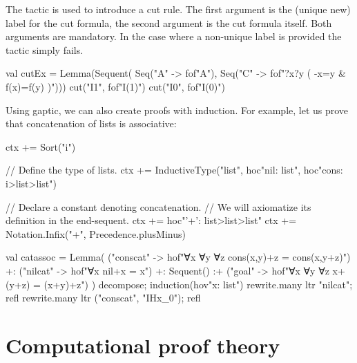 \documentclass[a4paper,11pt]{book}
\newcommand{\cli}[1]{{\ttfamily {#1}}}
\begin{document}
The \cli{cut} tactic is used to introduce a cut rule. The first argument is the
(unique new) label for the cut formula, the second argument is the cut formula
itself. Both arguments are mandatory. In the case where a non-unique label is
provided the tactic simply fails.
\begin{tacticslisting}
val cutEx = Lemma(Sequent(
    Seq("A" -> fof"A"),
    Seq("C" -> fof"?x?y ( -x=y & f(x)=f(y) )"))) {
  cut("I1", fof"I(1)")
  cut("I0", fof"I(0)")
}
\end{tacticslisting}

Using gaptic, we can also create proofs with induction.  For example, let us
prove that concatenation of lists is associative:

\begin{tacticslisting}[nosig]
ctx += Sort("i")

// Define the type of lists.
ctx += InductiveType("list",
  hoc"nil: list",
  hoc"cons: i>list>list")

// Declare a constant denoting concatenation.
// We will axiomatize its definition in the end-sequent.
ctx += hoc"'+': list>list>list"
ctx += Notation.Infix("+", Precedence.plusMinus)

val catassoc =
  Lemma(
      ("conscat" -> hof"∀x ∀y ∀z cons(x,y)+z = cons(x,y+z)") +:
      ("nilcat" -> hof"∀x nil+x = x") +:
      Sequent()
      :+ ("goal" -> hof"∀x ∀y ∀z x+(y+z) = (x+y)+z")
    ) {
  decompose; induction(hov"x: list")
  rewrite.many ltr "nilcat"; refl
  rewrite.many ltr ("conscat", "IHx_0"); refl
}
\end{tacticslisting}
\begin{tacticsoutput}
\end{tacticsoutput}


\chapter{Computational proof theory}
\end{document}

